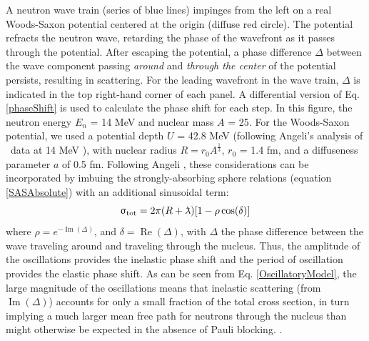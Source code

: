 \begin{eqation}
 A neutron wave train (series of
            blue lines) impinges from the left on a real Woods-Saxon
            potential centered at the origin (diffuse red circle). The potential
            refracts the neutron wave,
            retarding the phase of the wavefront as it passes through the
            potential. After escaping the potential, a phase difference $\Delta$ between
            the wave component passing \textit{around} and \textit{through the center}
            of the potential persists, resulting in scattering.
            For the leading wavefront in the wave train, $\Delta$ is indicated in
            the top right-hand corner of each panel. A differential version of
            Eq. \ref{phaseShift} is used to
            calculate the phase shift for each step. In this figure, the neutron
            energy $E_{n}$ = 14 MeV and nuclear mass $A$ = 25. For the Woods-Saxon potential,
            we used a potential depth $U$ = 42.8 MeV (following Angeli's analysis
            of \tot\ data at 14 MeV \cite{Angeli1970}), with nuclear radius $R = 
            r_{0}A^{\frac{1}{3}}$, $r_{0}$ = 1.4 fm, and a diffuseness parameter
        $a$ of 0.5 fm.
Following Angeli \cite{Angeli1970}, these considerations can be incorporated by
imbuing the strongly-absorbing sphere relations (equation \ref{SASAbsolute}) with an additional sinusoidal term:
\begin{equation} \label{OscillatoryModel}
    \tot = 2\pi (R+\lambdabar)[1 - \rho \cos(\delta)]
\end{equation}
where $\rho = e^{-\operatorname{Im}(\Delta)}$, and $\delta =
\operatorname{Re}(\Delta)$, with $\Delta$ the phase difference between the wave traveling
around and traveling through the nucleus. Thus, the amplitude of the oscillations provides the 
inelastic phase shift and the period of oscillation provides the elastic phase shift.
As can be seen from Eq. 
\ref{OscillatoryModel}, the large magnitude of the oscillations means that inelastic
scattering (from $\operatorname{Im}(\Delta)$) accounts for only a small fraction of the total cross section, in turn implying a 
much larger mean free path for neutrons through the nucleus 
than might otherwise be expected in the absence of Pauli blocking.
\cite{Mohr1955}.


\end{eqation}

